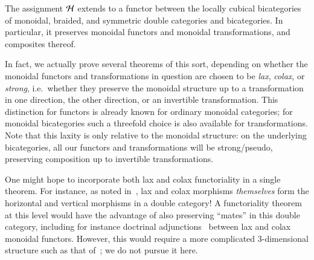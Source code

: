 \begin{thm}\label{thm:functor-intro}
  The assignment $\mathcal{H}$ extends to a functor between the locally cubical bicategories of monoidal, braided, and symmetric double categories and bicategories.
  In particular, it preserves monoidal functors and monoidal transformations, and composites thereof.
\end{thm}

In fact, we actually prove several theorems of this sort, depending on whether the monoidal functors and transformations in question are chosen to be \emph{lax}, \emph{colax}, or \emph{strong}, i.e.\ whether they preserve the monoidal structure up to a transformation in one direction, the other direction, or an invertible transformation.
This distinction for functors is already known for ordinary monoidal categories; for monoidal bicategories such a threefold choice is also available for transformations.
Note that this laxity is only relative to the monoidal structure: on the underlying bicategories, all our functors and transformations will be strong/pseudo, preserving composition up to invertible transformations.

One might hope to incorporate both lax and colax functoriality in a single theorem.
For instance, as noted in~\cite{gp:double-adjoints,shulman:dblderived}, lax and colax morphisms \emph{themselves} form the horizontal and vertical morphisms in a double category!
A functoriality theorem at this level would have the advantage of also preserving ``mates'' in this double category, including for instance doctrinal adjunctions~\cite{kelly:doc-adjn} between lax and colax monoidal functors.
However, this would require a more complicated 3-dimensional structure such as that of~\cite{gp:intercategories-i}; we do not pursue it here.

